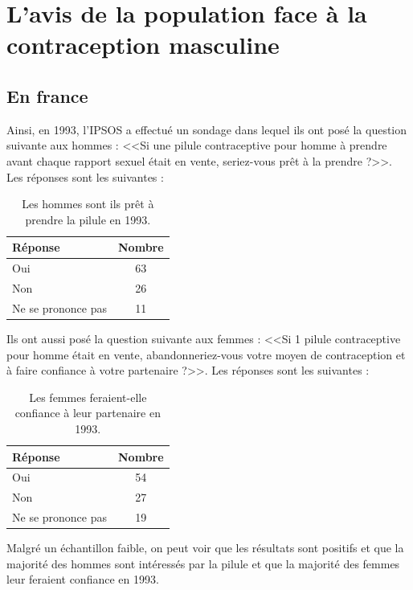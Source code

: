 \documentclass[12pt,a4paper]{report}
\begin{document}
\section{L'avis de la population face à la contraception masculine}

\subsection{En france}

Ainsi, en 1993, l'IPSOS a effectué un sondage dans lequel ils ont posé la question suivante aux hommes : <<Si une pilule contraceptive pour homme à prendre avant chaque rapport sexuel était en vente, seriez-vous prêt à la prendre ?>>.\cite{PiluleMasculine1993} Les réponses sont les suivantes :

\begin{table}[H]
\centering
\begin{tabular}{|l|c|}
\hline
\textbf{Réponse} & \textbf{Nombre} \\
\hline
Oui & 63 \\
Non & 26 \\
Ne se prononce pas & 11 \\
\hline
\end{tabular}
\caption{Les hommes sont ils prêt à prendre la pilule en 1993. \cite{PiluleMasculine1993}}
\end{table}

Ils ont aussi posé la question suivante aux femmes : <<Si 1 pilule contraceptive pour homme était en vente, abandonneriez-vous votre moyen de contraception et à faire confiance à votre partenaire ?>>. \cite{PiluleMasculine1993} Les réponses sont les suivantes :

\begin{table}[H]
\centering
\begin{tabular}{|l|c|}
\hline
\textbf{Réponse} & \textbf{Nombre} \\
\hline
Oui & 54 \\
Non & 27 \\
Ne se prononce pas & 19 \\
\hline
\end{tabular}
\caption{Les femmes feraient-elle confiance à leur partenaire en 1993. \cite{PiluleMasculine1993}}
\end{table}

Malgré un échantillon faible, on peut voir que les résultats sont positifs et que la majorité des hommes sont intéressés par la pilule et que la majorité des femmes leur feraient confiance en 1993.
\end{document}
